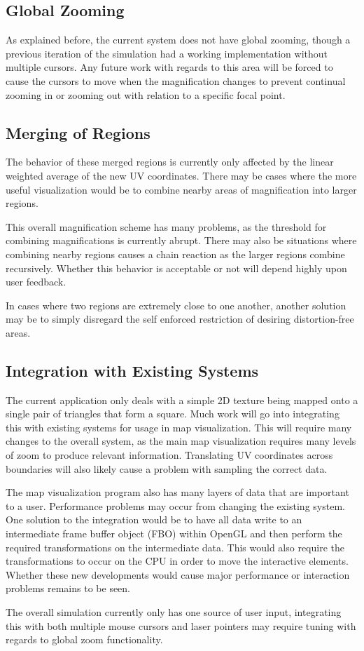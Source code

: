 \documentclass[annual]{acmsiggraph}
\begin{document}
\subsection{Global Zooming}
As explained before, the current system does not have global zooming, though
a previous iteration of the simulation had a working implementation without
multiple cursors. Any future work with regards to this area will be forced
to cause the cursors to move when the magnification changes to prevent 
continual zooming in or zooming out with relation to a specific focal point.

\subsection{Merging of Regions}
The behavior of these merged regions is currently only affected by the
linear weighted average of the new UV coordinates. There may be cases
where the more useful visualization would be to combine nearby
areas of magnification into larger regions. 

This overall magnification scheme has many problems, as the threshold
for combining magnifications is currently abrupt. There may also be
situations where combining nearby regions causes a chain reaction
as the larger regions combine recursively. Whether this behavior
is acceptable or not will depend highly upon user feedback.

In cases where two regions are extremely close to one another, another
solution may be to simply disregard the self enforced restriction
of desiring distortion-free areas. 

\subsection{Integration with Existing Systems}
The current application only deals with a simple 2D texture being mapped
onto a single pair of triangles that form a square. Much work will
go into integrating this with existing systems for usage in map
visualization. This will require many changes to the overall system,
as the main map visualization requires many levels of zoom to produce
relevant information. Translating UV coordinates across boundaries
will also likely cause a problem with sampling the correct data.

The map visualization program also has many layers of data that
are important to a user. Performance problems may occur from changing
the existing system. One solution to the integration would be to 
have all data write to an intermediate frame buffer object (FBO) within
OpenGL and then perform the required transformations on the intermediate
data. This would also require the transformations to occur on the CPU
in order to move the interactive elements. Whether these new developments
would cause major performance or interaction problems remains to be seen.

The overall simulation currently only has one source of user input,
integrating this with both multiple mouse cursors and laser pointers
may require tuning with regards to global zoom functionality.

 

\end{document}
